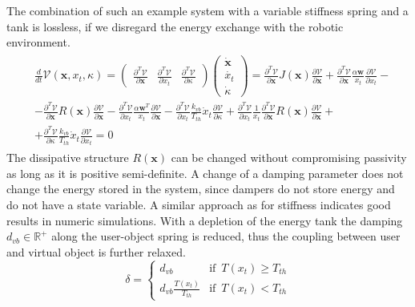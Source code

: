 \documentclass[a4paper,twoside, openright,12pt]{report}
\newcommand{\f}[1]{\boldsymbol{#1}}
\begin{document}
The combination of such an example system with a variable stiffness spring and a tank is lossless, if we disregard the energy exchange with the robotic environment.
\begin{eqnarray}
\begin{aligned}
&\frac{d}{dt}\mathcal{V}(\f{x},x_t,\kappa) = 
\begin{pmatrix}
\frac{\partial^T \mathcal{V}}{\partial \f{x}} & \frac{\partial^T \mathcal{V}}{\partial x_t} &
\frac{\partial^T \mathcal{V}}{\partial \kappa}
\end{pmatrix}
\begin{pmatrix}
\dot{\f{x}} \\ \dot{x_t} \\ \dot{\kappa}
\end{pmatrix}
= \frac{\partial^T \mathcal{V}}{\partial \f{x}}J(\f{x})\frac{\partial \mathcal{V}}{\partial \f{x}} + \frac{\partial^T \mathcal{V}}{\partial \f{x}}\frac{\alpha \f{w}}{x_t}\frac{\partial \mathcal{V}}{\partial x_t} - \\
&
 -\frac{\partial^T \mathcal{V}}{\partial \f{x}}R(\f{x})\frac{\partial \mathcal{V}}{\partial \f{x}} -\frac{\partial^T \mathcal{V}}{\partial x_t}\frac{\alpha \f{w}^T}{x_t} \frac{\partial \mathcal{V}}{\partial \f{x}} - \frac{\partial^T \mathcal{V}}{\partial x_t}\frac{k_{vb}}{T_{th}}\dot{x}_t \frac{\partial \mathcal{V}}{\partial \kappa}   + \frac{\partial^T \mathcal{V}}{\partial x_t}\frac{1}{x_t}\frac{\partial^T \mathcal{V}}{\partial \f{x}}R(\f{x})\frac{\partial \mathcal{V}}{\partial \f{x}} + \\
 &
+ \frac{\partial^T \mathcal{V}}{\partial \kappa} \frac{k_{vb}}{T_{th}}\dot{x}_t \frac{\partial \mathcal{V}}{\partial x_t}= 0
\end{aligned}
\end{eqnarray}
The dissipative structure $R(\f{x})$ can be changed without compromising passivity as long as it is positive semi-definite. A change of a damping parameter does not change the energy stored in the system, since dampers do not store energy and do not have a state variable. A similar approach as for stiffness indicates good results in numeric simulations. With a depletion of the energy tank the damping $d_{vb} \in \mathbb{R}^+$ along the user-object spring is reduced, thus the coupling between user and virtual object is further relaxed.
\begin{equation}
\delta = \begin{cases}
d_{vb} & \text{if } \, T(x_t)\geq T_{th} \\
d_{vb} \frac{T(x_t)}{T_{th}} & \text{if } \, T(x_t) < T_{th}
\end{cases}
\end{equation} 
\end{document}
